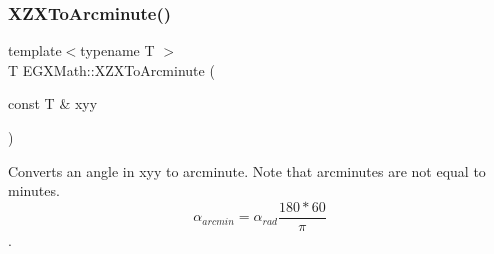 \mbox{\label{group___e_g_x_math-_angle_conversions-_x_z_x_ga291a98dde605fdf092ba16acb2989b84}} 
\subsubsection{\texorpdfstring{X\+Z\+X\+To\+Arcminute()}{XZXToArcminute()}}
{\footnotesize\ttfamily template$<$typename T $>$ \\
T E\+G\+X\+Math\+::\+X\+Z\+X\+To\+Arcminute (\begin{DoxyParamCaption}\item[{const T \&}]{xyy }\end{DoxyParamCaption})}



Converts an angle in xyy to arcminute. Note that arcminutes are not equal to minutes. \[\alpha_{arcmin}=\alpha_{rad}\frac{180 * 60}{\pi}\]. 

